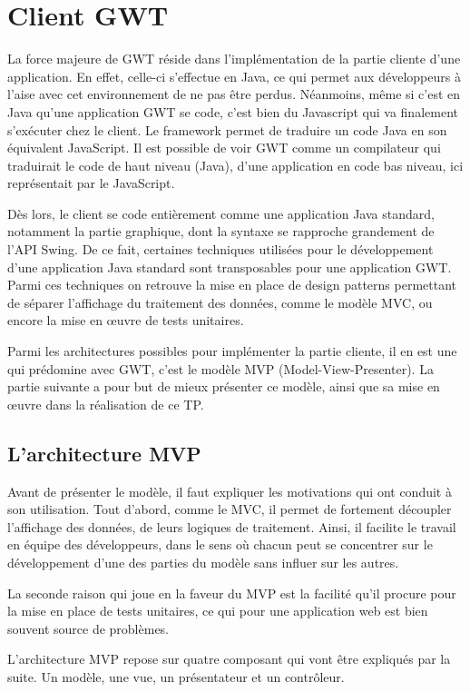 \chapter{Client GWT}
La force majeure de GWT réside dans l'implémentation de la partie cliente d'une application. En effet, celle-ci s'effectue en Java, ce qui permet aux développeurs à l'aise avec cet environnement de ne pas être perdus. Néanmoins, même si c'est en Java qu'une application GWT se code, c'est bien du Javascript qui va finalement s'exécuter chez le client. Le framework permet de traduire un code Java en son équivalent JavaScript. Il est possible de voir GWT comme un compilateur qui traduirait le code de haut niveau (Java), d'une application en code bas niveau, ici représentait par le JavaScript.

Dès lors, le client se code entièrement comme une application Java standard, notamment la partie graphique, dont la syntaxe se rapproche grandement de l'API Swing. De ce fait, certaines techniques utilisées pour le développement d'une application Java standard sont transposables pour une application GWT. Parmi ces techniques on retrouve la mise en place de design patterns permettant de séparer l'affichage du traitement des données, comme le modèle MVC, ou encore la mise en œuvre de tests unitaires.

Parmi les architectures possibles pour implémenter la partie cliente, il en est une qui prédomine avec GWT, c'est le modèle MVP (Model-View-Presenter). La partie suivante a pour but de mieux présenter ce modèle, ainsi que sa mise en œuvre dans la réalisation de ce TP.

\section{L'architecture MVP}
Avant de présenter le modèle, il faut expliquer les motivations qui ont conduit à son utilisation. Tout d'abord, comme le MVC, il permet de fortement découpler l'affichage des données, de leurs logiques de traitement. Ainsi, il facilite le travail en équipe des développeurs, dans le sens où chacun peut se concentrer sur le développement d'une des parties du modèle sans influer sur les autres.

La seconde raison qui joue en la faveur du MVP est la facilité qu'il procure pour la mise en place de tests unitaires, ce qui pour une application web est bien souvent source de problèmes.

L'architecture MVP repose sur quatre composant qui vont être expliqués par la suite. Un modèle, une vue, un présentateur et un contrôleur.

